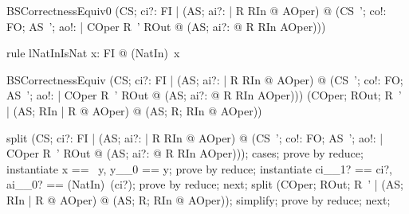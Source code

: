 \begin{theorem}{BSCorrectnessEquiv0} 
  (\forall CS; ci?: FI  | (\forall AS; ai?: \nat | R \land RIn @ \pre AOper) @
  	(\forall CS~'; co!: FO; AS~'; ao!: \nat | COper \land R~' \land ROut @
  		(\exists AS; ai?: \nat @ R \land RIn \land AOper)))
\end{theorem}


\begin{theorem}{rule lNatInIsNat}
   \forall x: FI @ (NatIn\inv)~x 
\end{theorem}

\begin{theorem}{BSCorrectnessEquiv} 
  (\forall CS; ci?: FI  | (\forall AS; ai?: \nat | R \land RIn @ \pre AOper) @
  	(\forall CS~'; co!: FO; AS~'; ao!: \nat | COper \land R~' \land ROut @
  		(\exists AS; ai?: \nat @ R \land RIn \land AOper)))
  	\iff
  (\forall COper; ROut; R~' | (\forall AS; RIn | R @ \pre AOper) @ (\exists AS; R; RIn @ AOper))
\end{theorem}

\begin{zproof}[BSCorrectnessEquiv]
split (\forall CS; ci?: FI  | (\forall AS; ai?: \nat | R \land RIn @ \pre AOper) @
  	(\forall CS~'; co!: FO; AS~'; ao!: \nat | COper \land R~' \land ROut @
  		(\exists AS; ai?: \nat @ R \land RIn \land AOper)));
cases;
prove by reduce;
instantiate x == \ran~y, y\_\_0 == y;
prove by reduce;
instantiate ci\_\_1? == ci?, ai\_\_0? == (NatIn\inv)~(ci?);
prove by reduce;
next;
split (\forall COper; ROut; R~' | (\forall AS; RIn | R @ \pre AOper) @ (\exists AS; R; RIn @ AOper));
simplify;
prove by reduce;
next;
\end{zproof}
